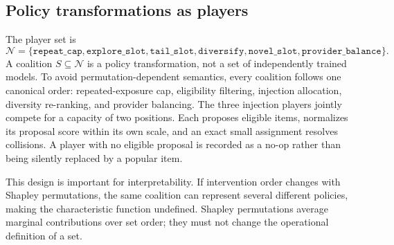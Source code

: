 \documentclass[pdflatex,sn-mathphys-num]{sn-jnl}
\theoremstyle{thmstyleone}
\theoremstyle{thmstyletwo}
\theoremstyle{thmstylethree}
\newcommand{\Players}{\mathcal{N}}
\begin{document}
\subsection{Policy transformations as players}

The player set is
\begin{equation}
 \Players=\{\texttt{repeat\_cap},\texttt{explore\_slot},\texttt{tail\_slot},\texttt{diversify},\texttt{novel\_slot},\texttt{provider\_balance}\}.
\label{eq:players}
\end{equation}
A coalition $S\subseteq\Players$ is a policy transformation, not a set of independently trained models. To avoid permutation-dependent semantics, every coalition follows one canonical order: repeated-exposure cap, eligibility filtering, injection allocation, diversity re-ranking, and provider balancing. The three injection players jointly compete for a capacity of two positions. Each proposes eligible items, normalizes its proposal score within its own scale, and an exact small assignment resolves collisions. A player with no eligible proposal is recorded as a no-op rather than being silently replaced by a popular item.

This design is important for interpretability. If intervention order changes with Shapley permutations, the same coalition can represent several different policies, making the characteristic function undefined. Shapley permutations average marginal contributions over set order; they must not change the operational definition of a set.
\end{document}
